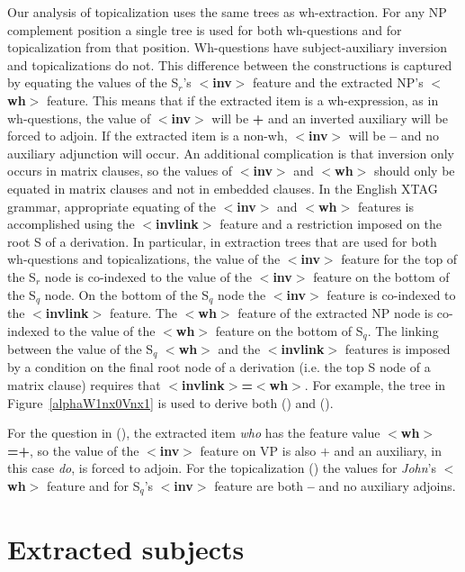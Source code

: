 Our analysis of topicalization uses the same trees as wh-extraction.  For any
NP complement position a single tree is used for both wh-questions and for
topicalization from that position. Wh-questions have subject-auxiliary
inversion and topicalizations do not.  This difference between the
constructions is captured by equating the values of the S$_{r}$'s {\bf
$<$inv$>$} feature and the extracted NP's {\bf $<$wh$>$} feature.  This means
that if the extracted item is a wh-expression, as in wh-questions, the value of
{\bf $<$inv$>$} will be {\bf +} and an inverted auxiliary will be forced to
adjoin. If the extracted item is a non-wh, {\bf $<$inv$>$} will be {\bf --}
and no auxiliary adjunction will occur. An additional complication is that
inversion only occurs in matrix clauses, so the values of {\bf $<$inv$>$} and
{\bf $<$wh$>$} should only be equated in matrix clauses and not in embedded
clauses.  In the English XTAG grammar, appropriate equating of the {\bf
$<$inv$>$} and {\bf $<$wh$>$} features is accomplished using the {\bf
$<$invlink$>$} feature and a restriction imposed on the root S of a
derivation. In particular, in extraction trees that are used for both
wh-questions and topicalizations, the value of the {\bf $<$inv$>$} feature for
the top of the S$_{r}$ node is co-indexed to the value of the {\bf $<$inv$>$}
feature on the bottom of the S$_{q}$ node.  On the bottom of the S$_{q}$ node
the {\bf $<$inv$>$} feature is co-indexed to the {\bf $<$invlink$>$} feature.
The {\bf $<$wh$>$} feature of the extracted NP node is co-indexed to the value
of the {\bf $<$wh$>$} feature on the bottom of S$_{q}$. The linking between the
value of the S$_{q}$ {\bf $<$wh$>$} and the {\bf $<$invlink$>$} features is
imposed by a condition on the final root node of a derivation (i.e. the top S
node of a matrix clause) requires that {\bf $<$invlink$>$=$<$wh$>$}.  For
example, the tree in Figure~\ref{alphaW1nx0Vnx1} is used to
derive both () and ().



For the question in (), the extracted item {\it who} has the feature
value {\bf $<$wh$>$=+}, so the value of the {\bf $<$inv$>$} feature on VP is
also $+$ and an auxiliary, in this case {\it do}, is forced to adjoin.  For the
topicalization () the values for {\it John}'s {\bf $<$wh$>$} feature and
for S$_{q}$'s {\bf $<$inv$>$} feature are both {\bf --} and no auxiliary
adjoins.



\section{Extracted subjects}
\label{subject-extraction}

